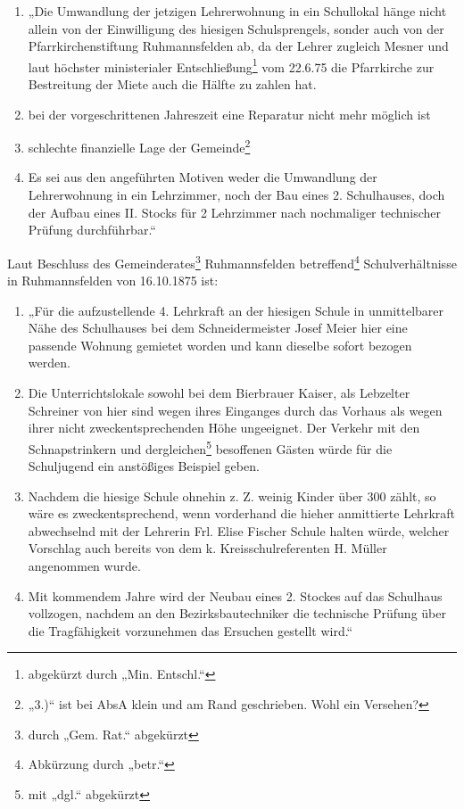 \documentclass[12pt,a4paper]{book}
\begin{document}
\begin{enumerate}
\item „Die Umwandlung der jetzigen Lehrerwohnung in ein Schullokal hänge
nicht allein von der Einwilligung des hiesigen Schulsprengels, sonder
auch von der Pfarrkirchenstiftung Ruhmannsfelden ab, da der Lehrer
zugleich Mesner und laut höchster ministerialer
Entschließung\footnote{abgekürzt durch „Min. Entschl.“} vom 22.6.75 die
Pfarrkirche zur Bestreitung der Miete auch die Hälfte zu zahlen hat.

\item bei der vorgeschrittenen Jahreszeit eine Reparatur nicht mehr
möglich ist

\item schlechte finanzielle Lage der Gemeinde\footnote{„3.)“ ist bei
AbsA klein und am Rand geschrieben. Wohl ein Versehen?}

\item Es sei aus den angeführten Motiven weder die Umwandlung der
Lehrerwohnung in ein Lehrzimmer, noch der Bau eines 2. Schulhauses, doch
der Aufbau eines II. Stocks für 2 Lehrzimmer nach nochmaliger
technischer Prüfung durchführbar.“
\end{enumerate}

Laut Beschluss des Gemeinderates\footnote{durch „Gem. Rat.“ abgekürzt}
Ruhmannsfelden betreffend\footnote{Abkürzung durch „betr.“}
Schulverhältnisse in Ruhmannsfelden von 16.10.1875 ist:

\begin{enumerate}
\item „Für die aufzustellende 4. Lehrkraft an der hiesigen Schule in
unmittelbarer Nähe des Schulhauses bei dem Schneidermeister Josef Meier
hier eine passende Wohnung gemietet worden und kann dieselbe sofort
bezogen werden.

\item Die Unterrichtslokale sowohl bei dem Bierbrauer Kaiser, als
Lebzelter Schreiner von hier sind wegen ihres Einganges durch das
Vorhaus als wegen ihrer nicht zweckentsprechenden Höhe ungeeignet. Der
Verkehr mit den Schnapstrinkern und dergleichen\footnote{mit „dgl.“
abgekürzt} besoffenen Gästen würde für die Schuljugend ein anstößiges
Beispiel geben.

\item Nachdem die hiesige Schule ohnehin z. Z. weinig Kinder über 300
zählt, so wäre es zweckentsprechend, wenn vorderhand die hieher
anmittierte Lehrkraft abwechselnd mit der Lehrerin Frl. Elise Fischer
Schule halten würde, welcher Vorschlag auch bereits von dem k.
Kreisschulreferenten H. Müller angenommen wurde.

\item Mit kommendem Jahre wird der Neubau eines 2. Stockes auf das Schulhaus
vollzogen, nachdem an den Bezirksbautechniker die technische Prüfung über die
Tragfähigkeit vorzunehmen das Ersuchen gestellt wird.“
\end{enumerate}
\end{document}
